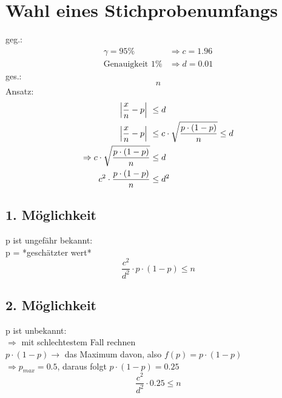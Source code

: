 \documentclass[a4paper,12pt]{article}
\begin{document}
\section{Wahl eines Stichprobenumfangs}
geg.:
\begin{equation*}
\begin{split}
\gamma = 95\% & \Rightarrow c = 1.96\\
\text{Genauigkeit }1\% & \Rightarrow d = 0.01
\end{split}
\end{equation*}
ges.:
$$n$$
Ansatz:
\begin{equation*}
\begin{split}
\Big{|} \frac{x}{n} - p \Big{|}\ & \leq d\\
\Big{|} \frac{x}{n} - p \Big{|}\ & \leq c \cdot \sqrt{\frac{p \cdot (1 - p)}{n}} \leq d\\
\Rightarrow c \cdot \sqrt{\frac{p \cdot (1 - p)}{n}} & \leq d\\
c^{2} \cdot \frac{p \cdot (1 - p)}{n} & \leq d^{2}
\end{split}
\end{equation*}
\subsection{1. Möglichkeit}
p ist ungefähr bekannt:\\
p = *geschätzter wert*\\
$$\frac{c^{2}}{d^{2}} \cdot p \cdot(1 - p) \leq n$$
\subsection{2. Möglichkeit}
p ist unbekannt:\\
$\Rightarrow$ mit schlechtestem Fall rechnen\\
$p \cdot (1 - p) \rightarrow$ das Maximum davon, also $f(p) = p \cdot (1 - p)$\\
$\Rightarrow p_{max} = 0.5$, daraus folgt $p \cdot (1 - p) = 0.25$\\
$$\frac{c^{2}}{d^{2}} \cdot 0.25 \leq n$$ 
\end{document}
